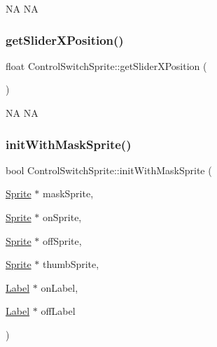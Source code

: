 NA  NA \mbox{\label{classControlSwitchSprite_a7c9434c61807a59e6ac34dbb2e7e840c}} 
\subsubsection{\texorpdfstring{get\+Slider\+X\+Position()}{getSliderXPosition()}\hspace{0.1cm}{\footnotesize\ttfamily [2/2]}}
{\footnotesize\ttfamily float Control\+Switch\+Sprite\+::get\+Slider\+X\+Position (\begin{DoxyParamCaption}{ }\end{DoxyParamCaption})\hspace{0.3cm}{\ttfamily [inline]}}

NA  NA \mbox{\label{classControlSwitchSprite_a154e78b91ffa77afad7a302f728f1a83}} 
\subsubsection{\texorpdfstring{init\+With\+Mask\+Sprite()}{initWithMaskSprite()}\hspace{0.1cm}{\footnotesize\ttfamily [1/2]}}
{\footnotesize\ttfamily bool Control\+Switch\+Sprite\+::init\+With\+Mask\+Sprite (\begin{DoxyParamCaption}\item[{\hyperlink{classSprite}{Sprite} $\ast$}]{mask\+Sprite,  }\item[{\hyperlink{classSprite}{Sprite} $\ast$}]{on\+Sprite,  }\item[{\hyperlink{classSprite}{Sprite} $\ast$}]{off\+Sprite,  }\item[{\hyperlink{classSprite}{Sprite} $\ast$}]{thumb\+Sprite,  }\item[{\hyperlink{classLabel}{Label} $\ast$}]{on\+Label,  }\item[{\hyperlink{classLabel}{Label} $\ast$}]{off\+Label }\end{DoxyParamCaption})\hspace{0.3cm}{\ttfamily [protected]}}

